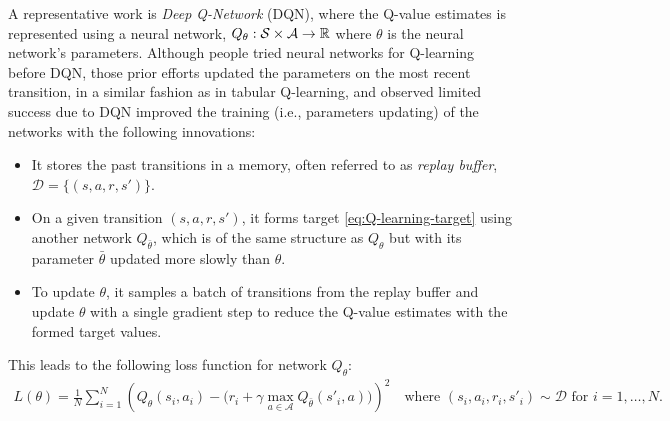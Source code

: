 A representative work is {\em Deep Q-Network} (DQN), where the Q-value estimates is represented using a neural network, $Q_\theta:\mathcal{S}\times\mathcal{A}\to\operatorname{\mathbb{R}}$ where $\theta$ is the neural network's parameters.
Although people tried neural networks for Q-learning before DQN, those prior efforts updated the parameters on the most recent transition, in a similar fashion as in tabular Q-learning, and observed limited success due to 
DQN improved the training (i.e., parameters updating) of the networks with the following innovations:
\begin{itemize}
    \item It stores the past transitions in a memory, often referred to as {\em replay buffer}, $\mathcal{D}=\{(s,a,r,s')\}$.
    \item On a given transition $(s,a,r,s')$, it forms target \eqref{eq:Q-learning-target} using another network $Q_{\bar{\theta}}$, which is of the same structure as $Q_{\theta}$ but with its parameter $\bar{\theta}$ updated more slowly than $\theta$.
    \item To update $\theta$, it samples a batch of transitions from the replay buffer and update $\theta$ with a single gradient step to reduce the Q-value estimates with the formed target values.
\end{itemize}
This leads to the following loss function for network $Q_\theta$:
\begin{align*}
    L(\theta) = \frac{1}{N}\sum_{i=1}^{N} \left( Q_\theta(s_i,a_i) - \big(r_i+\gamma \max_{a\in\mathcal{A}} Q_{\bar{\theta}}(s'_i, a)\big) \right)^2
    \quad \text{where }
    (s_i,a_i,r_i,s'_i)\sim\mathcal{D} \text{ for } i=1,\ldots,N.
\end{align*}